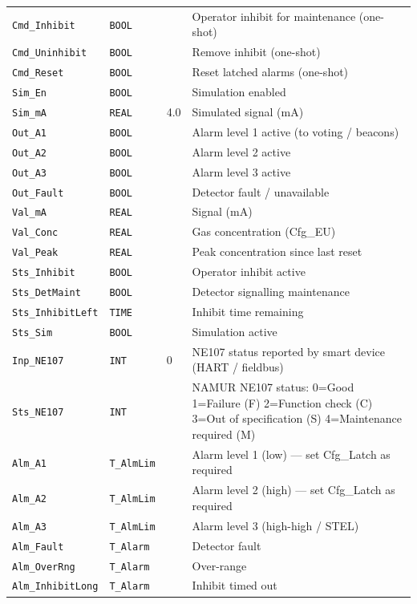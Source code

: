 \begin{small}
\begin{longtable}{@{}P{3.70cm}P{2.20cm}P{1.70cm}P{8.91cm}@{}}
\texttt{Cmd\_Inhibit} & \texttt{BOOL} &  & Operator inhibit for maintenance (one-shot) \\
\texttt{Cmd\_Uninhibit} & \texttt{BOOL} &  & Remove inhibit (one-shot) \\
\texttt{Cmd\_Reset} & \texttt{BOOL} &  & Reset latched alarms (one-shot) \\
\texttt{Sim\_En} & \texttt{BOOL} &  & Simulation enabled \\
\texttt{Sim\_mA} & \texttt{REAL} & 4.0 & Simulated signal (mA) \\
\texttt{Out\_A1} & \texttt{BOOL} &  & Alarm level 1 active (to voting /\allowbreak{} beacons) \\
\texttt{Out\_A2} & \texttt{BOOL} &  & Alarm level 2 active \\
\texttt{Out\_A3} & \texttt{BOOL} &  & Alarm level 3 active \\
\texttt{Out\_Fault} & \texttt{BOOL} &  & Detector fault /\allowbreak{} unavailable \\
\texttt{Val\_mA} & \texttt{REAL} &  & Signal (mA) \\
\texttt{Val\_Conc} & \texttt{REAL} &  & Gas concentration (Cfg\_EU) \\
\texttt{Val\_Peak} & \texttt{REAL} &  & Peak concentration since last reset \\
\texttt{Sts\_Inhibit} & \texttt{BOOL} &  & Operator inhibit active \\
\texttt{Sts\_DetMaint} & \texttt{BOOL} &  & Detector signalling maintenance \\
\texttt{Sts\_InhibitLeft} & \texttt{TIME} &  & Inhibit time remaining \\
\texttt{Sts\_Sim} & \texttt{BOOL} &  & Simulation active \\
\texttt{Inp\_NE107} & \texttt{INT} & 0 & NE107 status reported by smart device (HART /\allowbreak{} fieldbus) \\
\texttt{Sts\_NE107} & \texttt{INT} &  & NAMUR NE107 status: 0=Good 1=Failure (F) 2=Function check (C) 3=Out of specification (S) 4=Maintenance required (M) \\
\texttt{Alm\_A1} & \texttt{T\_AlmLim} &  & Alarm level 1 (low) --- set Cfg\_Latch as required \\
\texttt{Alm\_A2} & \texttt{T\_AlmLim} &  & Alarm level 2 (high) --- set Cfg\_Latch as required \\
\texttt{Alm\_A3} & \texttt{T\_AlmLim} &  & Alarm level 3 (high-high /\allowbreak{} STEL) \\
\texttt{Alm\_Fault} & \texttt{T\_Alarm} &  & Detector fault \\
\texttt{Alm\_OverRng} & \texttt{T\_Alarm} &  & Over-range \\
\texttt{Alm\_InhibitLong} & \texttt{T\_Alarm} &  & Inhibit timed out \\
\bottomrule
\end{longtable}
\end{small}

